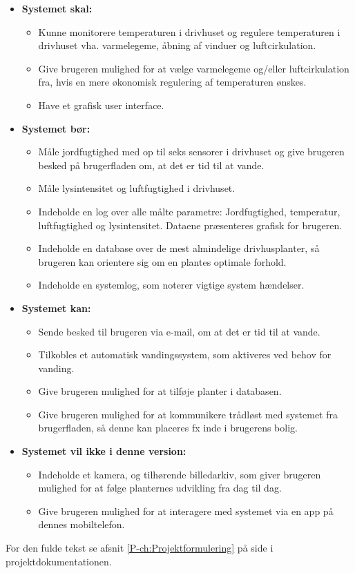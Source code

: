 \begin{itemize}
	\item \textbf{Systemet skal:}
		\begin{itemize}
			\item Kunne monitorere temperaturen i drivhuset og regulere temperaturen i drivhuset vha. varmelegeme, åbning af vinduer og luftcirkulation.
			\item Give brugeren mulighed for at vælge varmelegeme og/eller luftcirkulation fra, hvis en mere økonomisk regulering af temperaturen ønskes. 
			\item Have et grafisk user interface.
		\end{itemize}
	\item \textbf{Systemet bør:}
		\begin{itemize}
			\item Måle jordfugtighed med op til seks sensorer i drivhuset og give brugeren besked på brugerfladen om, at det er tid til at vande. 
			\item Måle lysintensitet og luftfugtighed i drivhuset.
			\item Indeholde en log over alle målte parametre: Jordfugtighed, temperatur, luftfugtighed og lysintensitet. 
			Dataene præsenteres grafisk for brugeren.
			\item Indeholde en database over de mest almindelige drivhusplanter, så brugeren kan orientere sig om en plantes optimale forhold.
			\item Indeholde en systemlog, som noterer vigtige system hændelser.
		\end{itemize}
	\item \textbf{Systemet kan:}
		\begin{itemize}
			\item Sende besked til brugeren via e-mail, om at det er tid til at vande.
			\item Tilkobles et automatisk vandingssystem, som aktiveres ved behov for vanding. 
			\item Give brugeren mulighed for at tilføje planter i databasen.
			\item Give brugeren mulighed for at kommunikere trådløst med systemet fra brugerfladen, så denne kan placeres fx inde i brugerens bolig. 
		\end{itemize}
	\item \textbf{Systemet vil ikke i denne version:}	
		\begin{itemize}
			\item Indeholde et kamera, og tilhørende billedarkiv, som giver brugeren mulighed for at følge planternes udvikling fra dag til dag. 
			\item Give brugeren mulighed for at interagere med systemet via en app på dennes mobiltelefon. 
		\end{itemize}
\end{itemize}

For den fulde tekst se afsnit \ref{P-ch:Projektformulering}  på side \pageref{P-ch:Projektformulering} i projektdokumentationen.

\clearpage